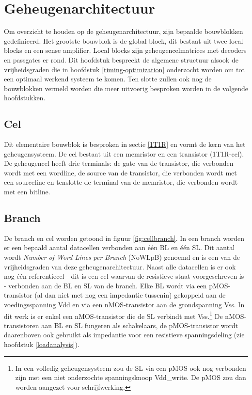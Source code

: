 \chapter{Geheugenarchitectuur}
\label{architecture}
Om overzicht te houden op de geheugenarchitectuur, zijn bepaalde bouwblokken gedefinieerd. Het grootste bouwblok is de global block, dit bestaat uit twee local blocks en een sense amplifier. Local blocks zijn geheugencelmatrices met decoders en passgates er rond.
Dit hoofdstuk bespreekt de algemene structuur alsook de vrijheidsgraden die in hoofdstuk \ref{timing-optimization} onderzocht worden om tot een optimaal werkend systeem te komen. Ten slotte zullen ook nog de bouwblokken vermeld worden die meer uitvoerig besproken worden in de volgende hoofdstukken. 


\section{Cel}
Dit elementaire bouwblok is besproken in sectie \ref{1T1R} en vormt de kern van het geheugensysteem.
De cel bestaat uit een memristor en een transistor (1T1R-cel). De geheugencel heeft drie terminals: de gate van de transistor, die verbonden wordt met een wordline, de source van de transistor, die verbonden wordt met een sourceline en tenslotte de terminal van de memristor, die verbonden wordt met een bitline.

\section{Branch}
De branch en cel worden getoond in figuur \ref{fig:cellbranch}. In een branch worden er een bepaald aantal datacellen verbonden aan één BL en één SL. Dit aantal wordt \emph{Number of Word Lines per Branch} (NoWLpB) genoemd en is een van de vrijheidsgraden van deze geheugenarchitectuur. Naast alle datacellen is er ook nog één referentiecel - dit is een cel waarvan de resistieve staat voorgeschreven is - verbonden aan de BL en SL van de branch.
Elke BL wordt via een pMOS-transistor (al dan niet met nog een impedantie tussenin) gekoppeld aan de voedingsspanning Vdd en via een nMOS-transistor aan de grondspanning Vss. In dit werk is er enkel een nMOS-transistor die de SL verbindt met Vss.\footnote{In een volledig geheugensysteem zou de SL via een pMOS ook nog verbonden zijn met een niet onderzochte spanningsknoop Vdd\_write. De pMOS zou dan worden aangezet voor schrijfwerking.} De nMOS-transistoren aan BL en SL fungeren als schakelaars, de pMOS-transistor wordt daarenboven ook gebruikt als impedantie voor een resistieve spanningsdeling (zie hoofdstuk \ref{loadanalysis}).

